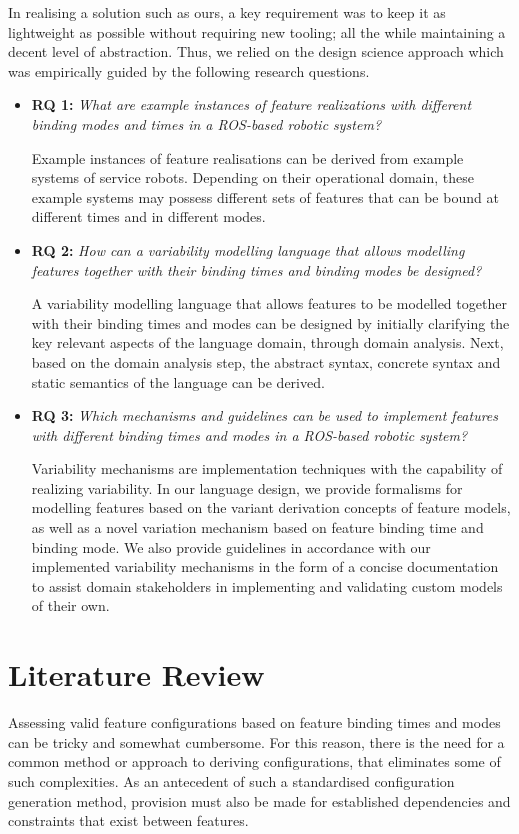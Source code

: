 \documentclass[conference]{IEEEtran}
\begin{document}
In realising a solution such as ours, a key requirement was to keep it as lightweight as possible without requiring new tooling; all the while maintaining a decent level of abstraction. Thus, we relied on the design science approach which was empirically guided by the following research questions.
\begin{itemize}
     \item \textbf{RQ 1: }\emph{What are example instances of feature realizations with different binding modes and times in a ROS-based robotic system?}
     
     Example instances of feature realisations can be derived from example systems of service robots. Depending on their operational domain, these example systems may possess different sets of features that can be bound at different times and in different modes.
    
    \item \textbf{RQ 2: } \emph{How can a variability modelling language that allows modelling features together with their binding times and binding modes be designed?}
    
    A variability modelling language that allows features to be modelled together with their binding times and modes can be designed by initially clarifying the key relevant aspects of the language domain, through domain analysis. Next, based on the domain analysis step, the abstract syntax, concrete syntax and static semantics of the language can be derived.
    
    \item \textbf{RQ 3:} \emph{Which mechanisms and guidelines can be used to implement features with different binding times and modes in a ROS-based robotic system?}
    
    Variability mechanisms are implementation techniques with the capability of realizing variability. In our language design, we provide formalisms for modelling features based on the variant derivation concepts of feature models, as well as a novel variation mechanism based on feature binding time and binding mode. We also provide guidelines in accordance with our implemented variability mechanisms in the form of a concise documentation to assist domain stakeholders in implementing and validating custom models of their own.
\end{itemize}

\section{Literature Review}
Assessing valid feature configurations based on feature binding times and modes can be tricky and somewhat cumbersome. For this reason, there is the need for a common method or approach to deriving configurations, that eliminates some of such complexities. As an antecedent of such a standardised configuration generation method, provision must also be made for established dependencies and constraints that exist between features.
\end{document}
